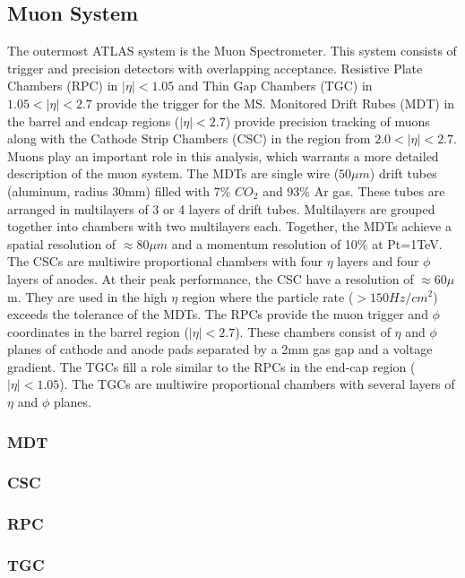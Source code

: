 \subsection{Muon System}
The outermost ATLAS system is the Muon Spectrometer.
This system consists of trigger and precision detectors with overlapping acceptance.
Resistive Plate Chambers (RPC) in $|\eta|<1.05$ and Thin Gap Chambers (TGC) in $1.05<|\eta|<2.7$ provide the trigger for the MS.
Monitored Drift Rubes (MDT) in the barrel and endcap regions ($|\eta|<2.7$) provide precision tracking of muons along with the Cathode Strip Chambers (CSC) in the region from $2.0<|\eta|<2.7$.
Muons play an important role in this analysis, which warrants a more detailed description of the muon system.
The MDTs are single wire ($50\mu m$) drift tubes (aluminum, radius 30mm) filled with 7\% $CO_2$ and 93\% Ar gas.
These tubes are arranged in multilayers of 3 or 4 layers of drift tubes.
Multilayers are grouped together into chambers with two multilayers each.
Together, the MDTs achieve a spatial resolution of $\approx80\mu m$ and a momentum resolution of 10\% at Pt=1TeV.
The CSCs are multiwire proportional chambers with four $\eta$ layers and four $\phi$ layers of anodes.
At their peak performance, the CSC have a resolution of $\approx60\mu$m.
They are used in the high $\eta$ region where the particle rate ($>150 Hz/cm^2$) exceeds the tolerance of the MDTs.
The RPCs provide the muon trigger and $\phi$ coordinates in the barrel region ($|\eta|<2.7$).
These chambers consist of $\eta$ and $\phi$ planes of cathode and anode pads separated by a 2mm gas gap and a voltage gradient.
The TGCs fill a role similar to the RPCs in the end-cap region ($|\eta|<1.05$).
The TGCs are multiwire proportional chambers with several layers of $\eta$ and $\phi$ planes. \cite{det-muon}
\subsubsection{MDT} %
\subsubsection{CSC} %
\subsubsection{RPC}
\subsubsection{TGC}

